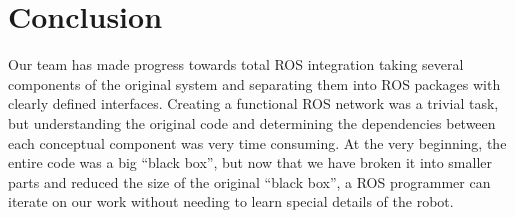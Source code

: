 \documentclass[letterpaper,twocolumn,10pt]{article}
\begin{document}
\section{Conclusion}

Our team has made progress towards total ROS integration taking
several components of the original system and separating them into ROS
packages with clearly defined interfaces. Creating a functional ROS
network was a trivial task, but understanding the original code and
determining the dependencies between each conceptual component was
very time consuming. At the very beginning, the entire code was a big
``black box'', but now that we have broken it into smaller parts and
reduced the size of the original ``black box'', a ROS programmer can
iterate on our work without needing to learn special details of the
robot.


\end{document}
